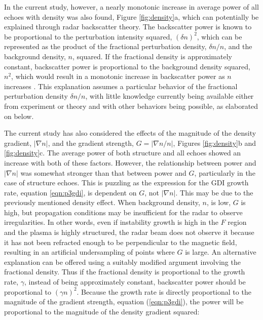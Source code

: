 In the current study, however, a nearly monotonic increase in average power of all echoes with density was also found, Figure \ref{fig:density}a, which can potentially be explained through radar backscatter theory. The backscatter power is known to be proportional to the perturbation intensity squared, \((\delta n)^2\), which can be represented as the product of the fractional perturbation density, \(\delta n/n\), and the background density, \(n\), squared.  If the fractional density is approximately constant, backscatter power is proportional to the background density squared, \(n^2\), which would result in a monotonic increase in backscatter power as \(n\) increases \citep{Kustov1988,Haldoupis1990,Makarevich2014b}. This explanation assumes a particular behavior of the fractional perturbation density \(\delta n/n\), with little knowledge currently being available either from experiment or theory and with other behaviors being possible, as elaborated on below.

The current study has also considered the effects of the magnitude of the density gradient, \(|\nabla n|\), and the gradient strength, \(G = |\nabla n/n|\), Figures \ref{fig:density}b and \ref{fig:density}c.  The average power of both structure and all echoes showed an increase with both of these factors.  However, the relationship between power and \(|\nabla n|\) was somewhat stronger than that between power and \(G\), particularly in the case of structure echoes. This is puzzling as the expression for the GDI growth rate, equation \ref{eqn:p3gdi}, is dependent on \(G\), not \(|\nabla n|\).  This may be due to the previously mentioned density effect. When background density, \(n\), is low, \(G\) is high, but propagation conditions may be insufficient for the radar to observe irregularities.  In other words, even if instability growth is high in the \(F\) region and the plasma is highly structured, the radar beam does not observe it because it has not been refracted enough to be perpendicular to the magnetic field, resulting in an artificial undersampling of points where \(G\) is large.  An alternative explanation can be offered using a suitably modified argument involving the fractional density. Thus if the fractional density is proportional to the growth rate, \(\gamma\), instead of being approximately constant, backscatter power should be proportional to \((\gamma n)^2\). Because the growth rate is directly proportional to the magnitude of the gradient strength, equation (\ref{eqn:p3gdi}), the power will be proportional to the magnitude of the density gradient squared:

